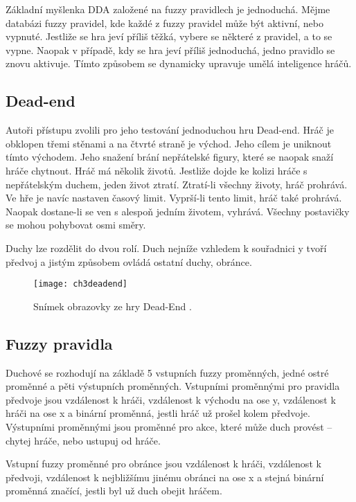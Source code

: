 Základní myšlenka DDA založené na fuzzy pravidlech je jednoduchá. Mějme databázi fuzzy pravidel, kde každé z fuzzy pravidel může být aktivní, nebo vypnuté. Jestliže se hra jeví příliš těžká, vybere se některé z pravidel, a to se vypne. Naopak v případě, kdy se hra jeví příliš jednoduchá, jedno pravidlo se znovu aktivuje. Tímto způsobem se dynamicky upravuje umělá inteligence hráčů.

\subsection{Dead-end}

Autoři přístupu zvolili pro jeho testování jednoduchou hru Dead-end\cite{25deadend}. Hráč je obklopen třemi stěnami a na čtvrté straně je východ. Jeho cílem je uniknout tímto východem. Jeho snažení brání nepřátelské figury, které se naopak snaží hráče chytnout. Hráč má několik životů. Jestliže dojde ke kolizi hráče s nepřátelským duchem, jeden život ztratí. Ztratí-li všechny životy, hráč prohrává. Ve hře je navíc nastaven časový limit. Vyprší-li tento limit, hráč také prohrává. Naopak dostane-li se ven s alespoň jedním životem, vyhrává. Všechny postavičky se mohou pohybovat osmi směry.

Duchy lze rozdělit do dvou rolí. Duch nejníže vzhledem k souřadnici y tvoří předvoj a jistým způsobem ovládá ostatní duchy, obránce.

\begin{figure}
  \centering
  \texttt{[image: ch3deadend]}
	\caption{Snímek obrazovky ze hry Dead-End \cite{25deadend}.}
	\label{ch3deadend}
\end{figure}

\subsection{Fuzzy pravidla}

Duchové se rozhodují na základě 5 vstupních fuzzy proměnných, jedné ostré proměnné a pěti výstupních proměnných.
Vstupními proměnnými pro pravidla předvoje jsou vzdálenost k hráči, vzdálenost k východu na ose y,  vzdálenost k hráči na ose x a binární proměnná, jestli hráč už prošel kolem předvoje. Výstupními proměnnými jsou proměnné pro akce, které může duch provést – chytej hráče, nebo ustupuj od hráče.

Vstupní fuzzy proměnné pro obránce jsou vzdálenost k hráči, vzdálenost k předvoji, vzdálenost k nejbližšímu jinému obránci na ose x a stejná binární proměnná značící, jestli byl už duch obejit hráčem.

